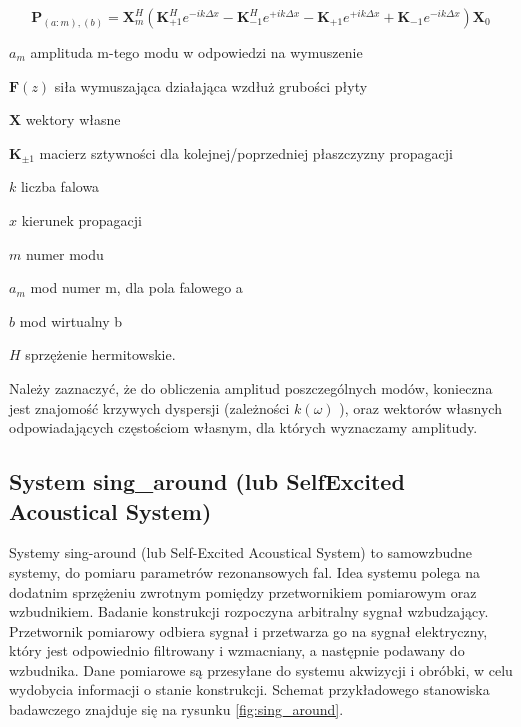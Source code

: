 \begin{equation} \label{eq:wzbudzanie3}
\textbf{P}_{(a:m),(b)} = \textbf{X}_m^{H} (\textbf{K}_{+1}^{H} e^{-ik\Delta x} - \textbf{K}_{-1}^{H} e^{+ik\Delta x} - \textbf{K}_{+1} e^{+ik\Delta x} + \textbf{K}_{-1} e^{-ik\Delta x})\textbf{X}_{0}
\end{equation}

\begin{eqwhere}[2cm]
	\item[$a_m$] amplituda m-tego modu w odpowiedzi na wymuszenie
	\item[$\textbf{F}(z)$] siła wymuszająca działająca wzdłuż grubości płyty
	\item[$\textbf{X}$] wektory własne 
	\item[$\textbf{K}_{\pm 1}$] macierz sztywności dla kolejnej/poprzedniej płaszczyzny propagacji
	\item[$k$] liczba falowa
	\item[$x$] kierunek propagacji
	\item[$m$] numer modu	
	\item[$a_m$] mod numer m, dla pola falowego a
	\item[$b$] mod wirtualny b	
	\item[$H$] sprzężenie hermitowskie.
\end{eqwhere}

Należy zaznaczyć, że do obliczenia amplitud poszczególnych modów, konieczna jest znajomość krzywych dyspersji (zależności \( k(\omega) \) ), oraz wektorów własnych odpowiadających częstościom własnym, dla których wyznaczamy amplitudy.

\subsection{System sing_around (lub Self\-Excited Acoustical System)}

Systemy sing-around (lub Self-Excited Acoustical System) to samowzbudne systemy, do pomiaru parametrów rezonansowych fal. Idea systemu polega na dodatnim sprzężeniu zwrotnym pomiędzy przetwornikiem pomiarowym oraz wzbudnikiem. Badanie konstrukcji rozpoczyna arbitralny sygnał wzbudzający. Przetwornik pomiarowy odbiera sygnał i przetwarza go na sygnał elektryczny, który jest odpowiednio filtrowany i wzmacniany, a następnie podawany do wzbudnika. Dane pomiarowe są przesyłane do systemu akwizycji i obróbki, w celu wydobycia informacji o stanie konstrukcji. Schemat przykładowego stanowiska badawczego znajduje się na rysunku \ref{fig:sing_around}.

